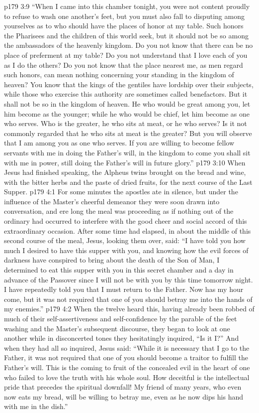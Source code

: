 \vs p179 3:9 \textcolor{ubdarkred}{“When I came into this chamber tonight, you were not content proudly to refuse to wash one another’s feet, but you must also fall to disputing among yourselves as to who should have the places of honor at my table. Such honors the Pharisees and the children of this world seek, but it should not be so among the ambassadors of the heavenly kingdom. Do you not know that there can be no place of preferment at my table? Do you not understand that I love each of you as I do the others? Do you not know that the place nearest me, as men regard such honors, can mean nothing concerning your standing in the kingdom of heaven? You know that the kings of the gentiles have lordship over their subjects, while those who exercise this authority are sometimes called benefactors. But it shall not be so in the kingdom of heaven. He who would be great among you, let him become as the younger; while he who would be chief, let him become as one who serves. Who is the greater, he who sits at meat, or he who serves? Is it not commonly regarded that he who sits at meat is the greater? But you will observe that I am among you as one who serves. If you are willing to become fellow servants with me in doing the Father’s will, in the kingdom to come you shall sit with me in power, still doing the Father’s will in future glory.”}
\vs p179 3:10 When Jesus had finished speaking, the Alpheus twins brought on the bread and wine, with the bitter herbs and the paste of dried fruits, for the next course of the Last Supper.
\vs p179 4:1 For some minutes the apostles ate in silence, but under the influence of the Master’s cheerful demeanor they were soon drawn into conversation, and ere long the meal was proceeding as if nothing out of the ordinary had occurred to interfere with the good cheer and social accord of this extraordinary occasion. After some time had elapsed, in about the middle of this second course of the meal, Jesus, looking them over, said: \textcolor{ubdarkred}{“I have told you how much I desired to have this supper with you, and knowing how the evil forces of darkness have conspired to bring about the death of the Son of Man, I determined to eat this supper with you in this secret chamber and a day in advance of the Passover since I will not be with you by this time tomorrow night. I have repeatedly told you that I must return to the Father. Now has my hour come, but it was not required that one of you should betray me into the hands of my enemies.”}
\vs p179 4:2 When the twelve heard this, having already been robbed of much of their self\hyp{}assertiveness and self\hyp{}confidence by the parable of the feet washing and the Master’s subsequent discourse, they began to look at one another while in disconcerted tones they hesitatingly inquired, “Is it I?” And when they had all so inquired, Jesus said: \textcolor{ubdarkred}{“While it is necessary that I go to the Father, it was not required that one of you should become a traitor to fulfill the Father’s will. This is the coming to fruit of the concealed evil in the heart of one who failed to love the truth with his whole soul. How deceitful is the intellectual pride that precedes the spiritual downfall! My friend of many years, who even now eats my bread, will be willing to betray me, even as he now dips his hand with me in the dish.”}
